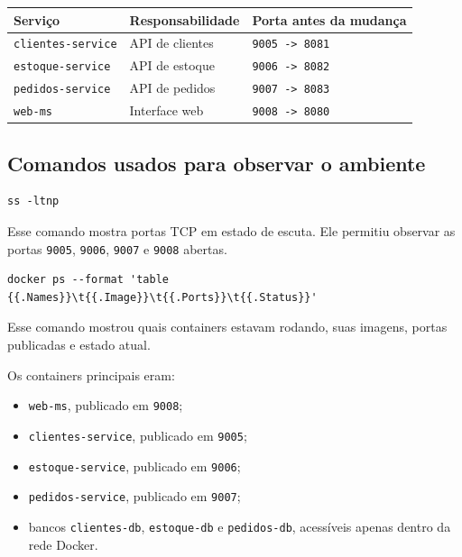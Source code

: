 \documentclass[12pt,a4paper]{article}
\begin{document}
\begin{center}
\begin{tabular}{lll}
\toprule
\textbf{Servi\c{c}o} & \textbf{Responsabilidade} & \textbf{Porta antes da mudan\c{c}a} \\
\midrule
\texttt{clientes-service} & API de clientes & \texttt{9005 -> 8081} \\
\texttt{estoque-service} & API de estoque & \texttt{9006 -> 8082} \\
\texttt{pedidos-service} & API de pedidos & \texttt{9007 -> 8083} \\
\texttt{web-ms} & Interface web & \texttt{9008 -> 8080} \\
\bottomrule
\end{tabular}
\end{center}

\subsection{Comandos usados para observar o ambiente}

\begin{lstlisting}[style=terminal]
ss -ltnp
\end{lstlisting}

Esse comando mostra portas TCP em estado de escuta. Ele permitiu observar as portas \texttt{9005}, \texttt{9006}, \texttt{9007} e \texttt{9008} abertas.

\begin{lstlisting}[style=terminal]
docker ps --format 'table {{.Names}}\t{{.Image}}\t{{.Ports}}\t{{.Status}}'
\end{lstlisting}

Esse comando mostrou quais containers estavam rodando, suas imagens, portas publicadas e estado atual.

\begin{infobox}
  Os containers principais eram:
  \begin{itemize}[leftmargin=1.5em]
    \item \texttt{web-ms}, publicado em \texttt{9008};
    \item \texttt{clientes-service}, publicado em \texttt{9005};
    \item \texttt{estoque-service}, publicado em \texttt{9006};
    \item \texttt{pedidos-service}, publicado em \texttt{9007};
    \item bancos \texttt{clientes-db}, \texttt{estoque-db} e \texttt{pedidos-db}, acess\'iveis apenas dentro da rede Docker.
  \end{itemize}
\end{infobox}
\end{document}
